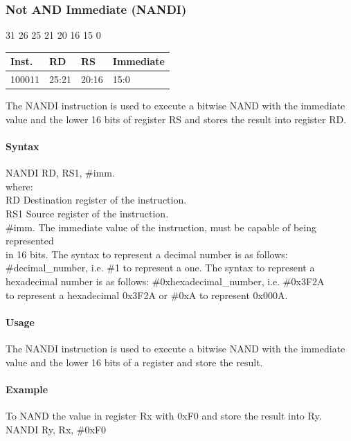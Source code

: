 \documentclass[12pt]{article}
\newcommand{\iTypeInstruction}[6]
{%
    \hspace{1.6cm}31 \hspace{1.15cm}26 \hspace{.05cm}25 \hspace{.8cm}21 \hspace{.05cm}20 \hspace{.8cm}16 \hspace{.05cm}15 \hspace{6.4cm}0
    \vspace{-.25cm}
    \begin{center}
        \begin{tabular}{ |p{1.8cm}|p{1.5cm}|p{1.5cm}|p{6.8cm}| }
            \hline
            \textbf{Inst.} & \textbf{RD} &  \textbf{RS} & \textbf{Immediate}\\
            \hline
            #1 & 25:21 & 20:16 &15:0\\
            \hline
        \end{tabular}
    \end{center}
    
    \noindent
    #2
    
    \paragraph{Syntax}
    \begin{flushleft}
    #3 RD, RS1, \#imm.\\
    \vspace{1em}        %
    where:\\
    \vspace{1em}
    RD  \hspace{3.6em} Destination register of the instruction.\\
    \vspace{1em}
    RS1  \hspace{3.35em} Source register of the instruction.\\
    \vspace{1em}
    \#imm.  \hspace{1.8em} The immediate value of the instruction, must be capable of being represented\\             \hspace{5.4em} in 16 bits. The syntax to represent a decimal number is as follows:\\
            \hspace{5.4em} \#decimal\_number, i.e. \#1 to represent a one. The syntax to represent a\\
            \hspace{5.4em} hexadecimal number is as follows: \#0xhexadecimal\_number, i.e. \#0x3F2A \\
            \hspace{5.4em} to represent a hexadecimal 0x3F2A or \#0xA to represent 0x000A.\\
    \end{flushleft}
    
    \paragraph{Usage}
    \begin{flushleft}
    #4\\
    \end{flushleft}
    \paragraph{Example}
    \begin{flushleft}
    #5\\
    \vspace{1em}
    #6
    \end{flushleft}}
\begin{document}

    \newpage
    \subsubsection{Not AND Immediate (NANDI)}
    
    \iTypeInstruction
    {100011}
    {The NANDI instruction is used to execute a bitwise NAND with the immediate value and the lower 16 bits of register RS and stores the result into register RD.}
    {NANDI}
    {The NANDI instruction is used to execute a bitwise NAND with the immediate value and the lower 16 bits of a register and store the result.}
    {To NAND the value in register Rx with 0xF0 and store the result into Ry.}
    {NANDI Ry, Rx, \#0xF0}
    
    
    
\end{document}
